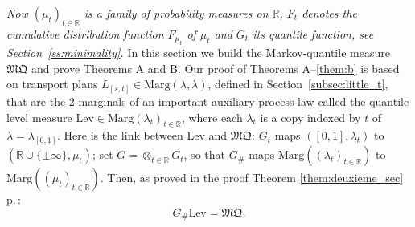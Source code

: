 \documentclass[10pt,a4paper]{article}
\theoremstyle{plain}
\theoremstyle{definition}
\newcommand{\mq}{\mathfrak{MQ}}
\newcommand{\lev}{\mathrm{Lev}}
\newcommand{\la}{\lambda}
\newcommand{\ma}{\mathrm{Marg}}
\newcommand{\R}{\mathbb{R}}
\begin{document}
\emph{Now $(\mu_t)_{t\in \R}$ is a family of probability measures on $\R$, $F_t$ denotes the cumulative distribution function $F_{\mu_t}$ of $\mu_t$ and $G_t$ its quantile function, see Section~\ref{ss:minimality}.} In this section we build the Markov-quantile measure $\mq$ and prove Theorems A and B. Our proof of Theorems A--\ref{them:b} is based on transport plans $L_{[s,t]}\in \ma(\la,\la)$, defined in Section~\ref{subsec:little_t}, that are the 2-marginals of an important auxiliary process law called the quantile level measure $\lev\in\ma(\la_t)_{t\in\R}$, where each $\lambda_t$ is a copy indexed by $t$ of $\la=\la_{[0,1]}$. Here is the link between $\lev$ and $\mq$: $G_t$ maps $([0,1],\la_t)$ to $(\R\cup\{\pm \infty\},\mu_t)$; set $G=\otimes_{t\in\R}G_t$, so that $G_\#$ maps $\ma((\lambda_t)_{t\in\R})$ to $\ma((\mu_t)_{t\in\R})$. Then, as proved in the proof Theorem \ref{them:deuxieme_sec} p.\,\pageref{lieu_preuve_glev}:\vspace*{-3pt}
\begin{equation}\label{eq:Glev}
G_\#\lev=\mq.
\end{equation}
\end{document}
